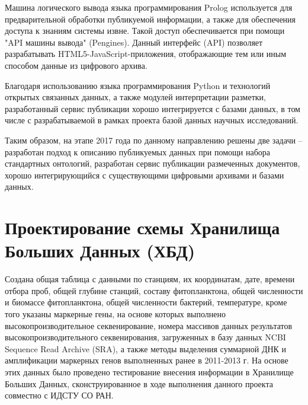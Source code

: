 \documentclass[a4paper,12pt,openany,final]{extreport}
\begin{document}
Машина логического вывода языка программирования Prolog используется для
предварительной обработки публикуемой информации, а также для
обеспечения доступа к знаниям системы извне. Такой доступ обеспечивается
при помощи "API машины вывода" (Pengines). Данный интерфейс (API)
позволяет разрабатывать HTML5-JavaScript-приложения, отображающие тем
или иным способом данные из цифрового архива.

Благодаря использованию языка программирования Python и технологий
открытых связанных данных, а также модулей интерпретации разметки,
разработанный сервис публикации хорошо интегрируется с базами данных, в
том числе с разрабатываемой в рамках проекта базой данных научных
исследований.

Таким образом, на этапе 2017 года по данному направлению решены две
задачи -- разработан подход к описанию публикуемых данных при помощи
набора стандартных онтологий, разработан сервис публикации размеченных
документов, хорошо интегрирующийся с существующими цифровыми архивами и
базами данных.

\chapter{Проектирование схемы Хранилища Больших Данных (ХБД)}\label{chap:8}

Создана общая таблица с данными по станциям, их координатам, дате,
времени отбора проб, общей глубине станций, составу фитопланктона, общей
численности и биомассе фитопланктона, общей численности бактерий,
температуре, кроме того указаны маркерные гены, на основе которых
выполнено высокопроизводительное секвенирование, номера массивов данных
результатов высокопроизводительного секвенирования, загруженных в базу
данных NCBI Sequence Read Archive (SRA), а также методы выделения
суммарной ДНК и амплификации маркерных генов выполненных ранее в
2011-2013 г. На основе этих данных было проведено тестирование внесения
информации в Хранилище Больших Данных, сконструированное в ходе
выполнения данного проекта совместно с ИДСТУ СО РАН.
\end{document}
